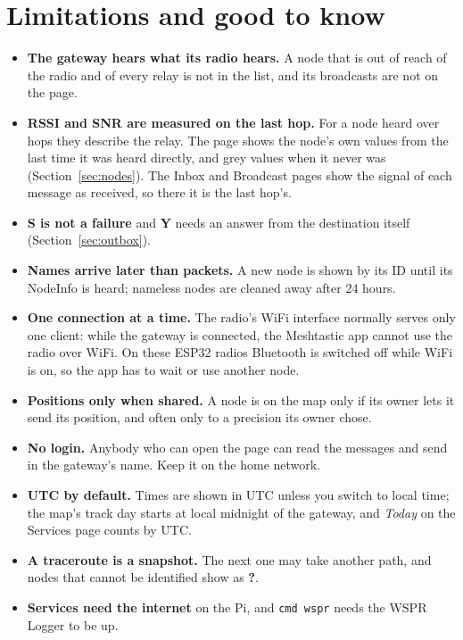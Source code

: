 \documentclass[10pt,a4paper]{article}
\newcommand{\cmd}[1]{\texttt{#1}}
\newcommand{\ackY}{\textcolor{ackY}{\textbf{Y}}}
\newcommand{\ackS}{\textcolor{ackS}{\textbf{S}}}
\begin{document}
\section{Limitations and good to know}\label{sec:limits}
\begin{itemize}[leftmargin=1.2em]
\item \textbf{The gateway hears what its radio hears.} A node that is out of reach of the radio and of every relay is not in the list, and its broadcasts are not on the page.
\item \textbf{RSSI and SNR are measured on the last hop.} For a node heard over hops they describe the relay. The page shows the node's own values from the last time it was heard directly, and grey values when it never was (Section~\ref{sec:nodes}). The Inbox and Broadcast pages show the signal of each message as received, so there it is the last hop's.
\item \textbf{\ackS{} is not a failure} and \ackY{} needs an answer from the destination itself (Section~\ref{sec:outbox}).
\item \textbf{Names arrive later than packets.} A new node is shown by its ID until its NodeInfo is heard; nameless nodes are cleaned away after 24 hours.
\item \textbf{One connection at a time.} The radio's WiFi interface normally serves only one client: while the gateway is connected, the Meshtastic app cannot use the radio over WiFi. On these ESP32 radios Bluetooth is switched off while WiFi is on, so the app has to wait or use another node.
\item \textbf{Positions only when shared.} A node is on the map only if its owner lets it send its position, and often only to a precision its owner chose.
\item \textbf{No login.} Anybody who can open the page can read the messages and send in the gateway's name. Keep it on the home network.
\item \textbf{UTC by default.} Times are shown in UTC unless you switch to local time; the map's track day starts at local midnight of the gateway, and \emph{Today} on the Services page counts by UTC.
\item \textbf{A traceroute is a snapshot.} The next one may take another path, and nodes that cannot be identified show as \textbf{?}.
\item \textbf{Services need the internet} on the Pi, and \cmd{cmd wspr} needs the WSPR Logger to be up.
\end{itemize}
\end{document}
